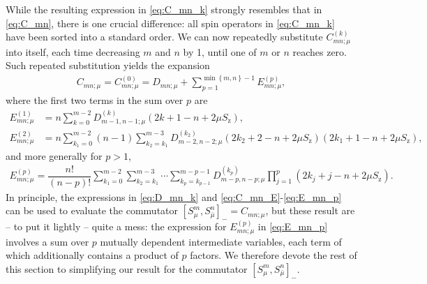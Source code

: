 \documentclass[aps,11pt,notitlepage,nofootinbib,longbibliography]{revtex4-1}
\newcommand{\f}[2]{\dfrac{#1}{#2}} %
\newcommand{\p}[1]{\left(#1\right)} %
\renewcommand{\sp}[1]{\left[#1\right]} %
\renewcommand{\set}[1]{\left\{#1\right\}} %
\newcommand{\z}{\text{z}}
\newcommand{\bmu}{{\bar\mu}}
\newcommand{\1}{\mathds{1}}
\begin{document}
While the resulting expression in \eqref{eq:C_mn_k} strongly resembles
that in \eqref{eq:C_mn}, there is one crucial difference: all spin
operators in \eqref{eq:C_mn_k} have been sorted into a standard order.
We can now repeatedly substitute $C_{mn;\mu}^{(k)}$ into itself, each
time decreasing $m$ and $n$ by 1, until one of $m$ or $n$ reaches
zero.  Such repeated substitution yields the expansion
\begin{align}
  C_{mn;\mu}
  = C_{mn;\mu}^{(0)}
  = D_{mn;\mu}
  + \sum_{p=1}^{\min\set{m,n}-1} E_{mn;\mu}^{(p)},
  \label{eq:C_mn_E}
\end{align}
where the first two terms in the sum over $p$ are
\begin{align}
  E_{mn;\mu}^{(1)}
  &= n \sum_{k=0}^{m-2} D_{m-1,n-1;\mu}^{(k)} \p{2k+1-n+2\mu S_\z}, \\
  E_{mn;\mu}^{(2)}
  &= n \sum_{k_1=0}^{m-2} \p{n-1} \sum_{k_2=k_1}^{m-3}
  D_{m-2,n-2;\mu}^{(k_2)} \p{2k_2+2-n+2\mu S_\z} \p{2k_1+1-n+2\mu S_\z},
\end{align}
and more generally for $p>1$,
\begin{align}
  E_{mn;\mu}^{(p)}
  = \f{n!}{\p{n-p}!}
  \sum_{k_1=0}^{m-2} \sum_{k_2=k_1}^{m-3} \cdots\sum_{k_p=k_{p-1}}^{m-p-1}
  D_{m-p,n-p;\mu}^{(k_p)} \prod_{j=1}^p \p{2k_j+j-n+2\mu S_\z}.
  \label{eq:E_mn_p}
\end{align}
In principle, the expressions in \eqref{eq:D_mn_k} and
\eqref{eq:C_mn_E}-\eqref{eq:E_mn_p} can be used to evaluate the
commutator $\sp{S_\mu^m,S_\bmu^n}_- = C_{mn;\mu}$, but these result
are -- to put it lightly -- quite a mess: the expression for
$E_{mn;\mu}^{(p)}$ in \eqref{eq:E_mn_p} involves a sum over $p$
mutually dependent intermediate variables, each term of which
additionally contains a product of $p$ factors.  We therefore devote
the rest of this section to simplifying our result for the commutator
$\sp{S_\mu^m,S_\bmu^n}_-$.
\end{document}
